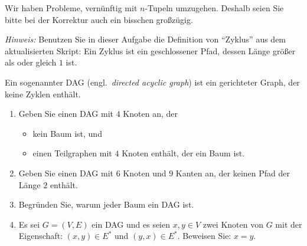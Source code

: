 \documentclass[12pt]{article}
\begin{document}
\begin{loesung}
\begin{enumerate}
          \begin{korrektur}
            Wir haben Probleme, vernünftig mit $n$-Tupeln umzugehen.
            Deshalb seien Sie bitte bei der Korrektur auch ein bisschen großzügig.
          \end{korrektur}




  \end{enumerate}
\end{loesung}

\begin{aufgabe}[1 + 1 + 2 + 2 = 6]
  \emph{Hinweis:} Benutzen Sie in dieser Aufgabe die Definition von
  "`Zyklus"' aus dem aktualisierten Skript: Ein Zyklus ist ein
  geschlossener Pfad, dessen Länge größer als oder gleich $1$ ist.

  Ein sogenannter DAG (engl.~\emph{directed acyclic graph}) ist ein
  gerichteter Graph, der keine Zyklen enthält.

  \begin{enumerate}
  \item Geben Sie einen DAG mit $4$ Knoten an, der
    \begin{itemize}
    \item kein Baum ist, und
    \item einen Teilgraphen mit $4$ Knoten enthält, der ein Baum ist.
    \end{itemize}
  \item Geben Sie einen DAG mit $6$ Knoten und $9$ Kanten an, der
    keinen Pfad der Länge $2$ enthält.
  \item Begründen Sie, warum jeder Baum ein DAG ist.
  \item Es sei $G=(V,E)$ ein DAG und es seien $x,y\in V$ zwei Knoten
    von $G$ mit der Eigenschaft: $(x,y)\in E^*$ und $(y,x)\in E^*$.
    Beweisen Sie: $x=y$.
  \end{enumerate}
\end{aufgabe}
\end{document}
